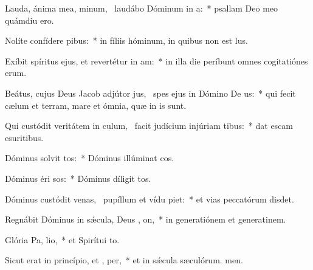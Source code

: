 \item Lauda, ánima mea, minum,~\pscross{} laudábo Dóminum in  a:~* psallam Deo meo quámdiu ero.
\item Nolíte confídere  pibus:~* in fíliis hóminum, in quibus non est lus.
\item Exíbit spíritus ejus, et revertétur in  am:~* in illa die períbunt omnes cogitatiónes erum.
\item Beátus, cujus Deus Jacob adjútor jus,~\pscross{} spes ejus in Dómino De us:~* qui fecit cælum et terram, mare et ómnia, quæ in is sunt.
\item Qui custódit veritátem in culum,~\pscross{} facit judícium injúriam tibus:~* dat escam esuritibus.
\item Dóminus solvit tos:~* Dóminus illúminat cos.
\item Dóminus éri sos:~* Dóminus díligit tos.
\item Dóminus custódit venas,~\pscross{} pupíllum et vídu piet:~* et vias peccatórum disdet.
\item Regnábit Dóminus in sǽcula, Deus , on,~* in generatiónem et generatinem.
\item Glória Pa,  lio,~* et Spirítui to.
\item Sicut erat in princípio, et ,  per,~* et in sǽcula sæculórum. men.
